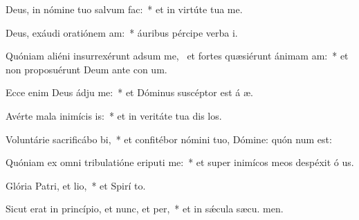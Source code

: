 \item Deus, in nómine tuo salvum  fac:~* et in virtúte tua  me.
\item Deus, exáudi oratiónem am:~* áuribus pércipe verba  i.
\item Quóniam aliéni insurrexérunt adsum me,~\pscross{} et fortes quæsiérunt ánimam am:~* et non proposuérunt Deum ante con um.
\item Ecce enim Deus ádju me:~* et Dóminus suscéptor est á æ.
\item Avérte mala inimícis is:~* et in veritáte tua dis los.
\item Voluntárie sacrificábo bi,~* et confitébor nómini tuo, Dómine: quón num est:
\item Quóniam ex omni tribulatióne eriputi me:~* et super inimícos meos despéxit ó us.
\item Glória Patri, et lio,~* et Spirí to.
\item Sicut erat in princípio, et nunc, et per,~* et in sǽcula sæcu. men.
